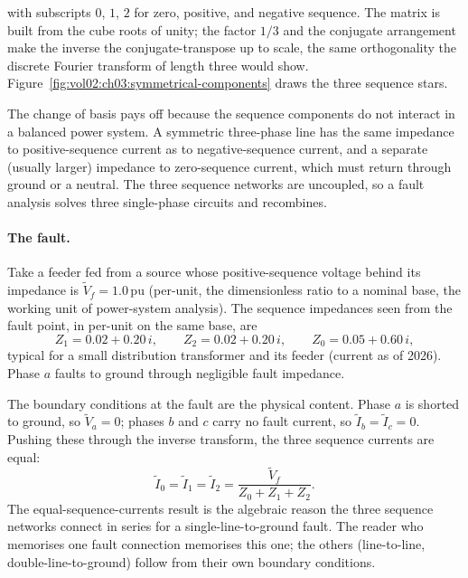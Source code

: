 with subscripts $0$, $1$, $2$ for zero, positive, and negative sequence.
The matrix is built from the cube roots of unity; the factor $1/3$ and
the conjugate arrangement make the inverse the conjugate-transpose up to
scale, the same orthogonality the discrete Fourier transform of length
three would show.
Figure~\ref{fig:vol02:ch03:symmetrical-components} draws the three
sequence stars.

The change of basis pays off because the sequence components do not
interact in a balanced power system. A symmetric three-phase line has
the same impedance to positive-sequence current as to negative-sequence
current, and a separate (usually larger) impedance to zero-sequence
current, which must return through ground or a neutral. The three
sequence networks are uncoupled, so a fault analysis solves three
single-phase circuits and recombines.

\paragraph{The fault.} Take a feeder fed from a source whose
positive-sequence voltage behind its impedance is $\tilde V_{f} =
1.0\,\text{pu}$ (per-unit, the dimensionless ratio to a nominal base, the
working unit of power-system analysis). The sequence impedances seen from
the fault point, in per-unit on the same base, are
\[
Z_{1} = 0.02 + 0.20\,i, \qquad
Z_{2} = 0.02 + 0.20\,i, \qquad
Z_{0} = 0.05 + 0.60\,i,
\]
typical for a small distribution transformer and its feeder (current as
of 2026). Phase $a$ faults to ground through negligible fault impedance.

The boundary conditions at the fault are the physical content. Phase $a$
is shorted to ground, so $\tilde V_{a} = 0$; phases $b$ and $c$ carry no
fault current, so $\tilde I_{b} = \tilde I_{c} = 0$. Pushing these
through the inverse transform, the three sequence currents are equal:
\[
\tilde I_{0} = \tilde I_{1} = \tilde I_{2}
= \frac{\tilde V_{f}}{Z_{0} + Z_{1} + Z_{2}}.
\]
The equal-sequence-currents result is the algebraic reason the three
sequence networks connect in series for a single-line-to-ground fault.
The reader who memorises one fault connection memorises this one; the
others (line-to-line, double-line-to-ground) follow from their own
boundary conditions.

